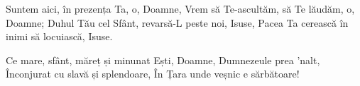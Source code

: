 \beginverse
Suntem aici, în prezența Ta, o, Doamne,
Vrem să Te-ascultăm, să Te lăudăm, o, Doamne;
Duhul Tău cel Sfânt, revarsă-L peste noi, Isuse,
Pacea Ta cerească în inimi să locuiască, Isuse.
\endverse

\beginchorus
Ce mare, sfânt, măreț și minunat
Ești, Doamne, Dumnezeule prea ’nalt,
Înconjurat cu slavă și splendoare,
În Țara unde veșnic e sărbătoare!
\endchorus
\endsong